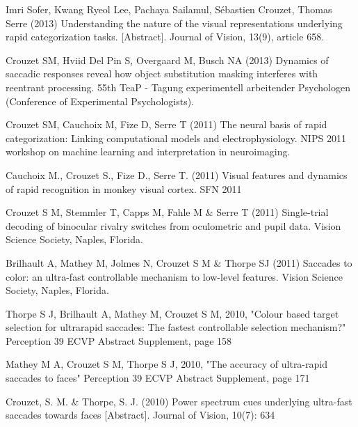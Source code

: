 \documentclass[margin,line]{resume}
\begin{document}
\begin{resume}
	\vspace{-2mm} Imri Sofer, Kwang Ryeol Lee, Pachaya Sailamul, Sébastien Crouzet, Thomas Serre (2013) Understanding the nature of the visual representations underlying rapid categorization tasks. [Abstract]. Journal of Vision, 13(9), article 658.
	
	\newpage

	\vspace{-2mm} Crouzet SM, Hviid Del Pin S, Overgaard M, Busch NA (2013) Dynamics of saccadic responses reveal how object substitution masking interferes with reentrant processing. 55th TeaP - Tagung experimentell arbeitender Psychologen (Conference of Experimental Psychologists).

	\vspace{-2mm} Crouzet SM, Cauchoix M, Fize D, Serre T (2011) The neural basis of rapid categorization: Linking computational models and electrophysiology. NIPS 2011 workshop on machine learning and interpretation in neuroimaging.

	\vspace{-2mm} Cauchoix M., Crouzet S., Fize D., Serre T. (2011) Visual features and dynamics of rapid recognition in monkey visual cortex. SFN 2011

	\vspace{-2mm} Crouzet S M, Stemmler T, Capps M, Fahle M \& Serre T (2011) Single-trial decoding of binocular rivalry switches from oculometric and pupil data. Vision Science Society, Naples, Florida.

	\vspace{-2mm} Brilhault A, Mathey M, Jolmes N, Crouzet S M \& Thorpe SJ (2011) Saccades to color: an ultra-fast controllable mechanism to low-level features. Vision Science Society, Naples, Florida.

	\vspace{-2mm} Thorpe S J, Brilhault A, Mathey M, Crouzet S M, 2010, "Colour based target selection for ultrarapid saccades: The fastest controllable selection mechanism?" Perception 39 ECVP Abstract Supplement, page 158

	\vspace{-2mm} Mathey M A, Crouzet S M, Thorpe S J, 2010, "The accuracy of ultra-rapid saccades to faces" Perception 39 ECVP Abstract Supplement, page 171

	\vspace{-2mm} Crouzet, S. M. \& Thorpe, S. J. (2010) Power spectrum cues underlying ultra-fast saccades towards faces [Abstract]. Journal of Vision, 10(7): 634


\end{resume}
\end{document}
